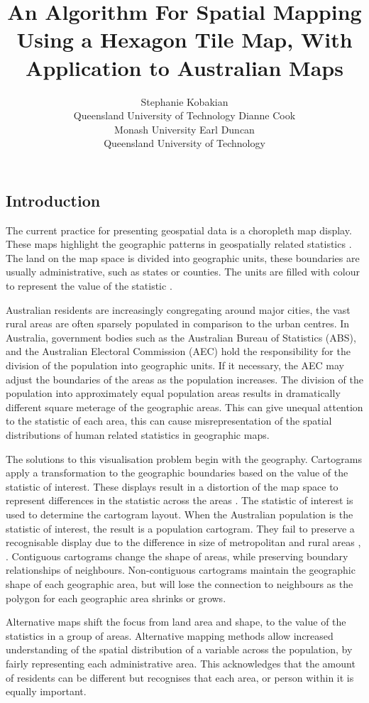 \documentclass[
]{jss}
\author{
Stephanie Kobakian\\Queensland University of Technology \And Dianne Cook\\Monash University \And Earl Duncan\\Queensland University of Technology
}
\title{An Algorithm For Spatial Mapping Using a Hexagon Tile Map, With
Application to Australian Maps}
\begin{document}
\setcounter{page}{65}

\hypertarget{introduction}{%
\subsection{Introduction}\label{introduction}}

The current practice for presenting geospatial data is a choropleth map
display. These maps highlight the geographic patterns in geospatially
related statistics \citep{SAMGIS}. The land on the map space is divided
into geographic units, these boundaries are usually administrative, such
as states or counties. The units are filled with colour to represent the
value of the statistic \citep{EI}.

Australian residents are increasingly congregating around major cities,
the vast rural areas are often sparsely populated in comparison to the
urban centres. In Australia, government bodies such as the Australian
Bureau of Statistics (ABS), and the Australian Electoral Commission
(AEC) hold the responsibility for the division of the population into
geographic units. If it necessary, the AEC may adjust the boundaries of
the areas as the population increases. The division of the population
into approximately equal population areas results in dramatically
different square meterage of the geographic areas. This can give unequal
attention to the statistic of each area, this can cause
misrepresentation of the spatial distributions of human related
statistics in geographic maps.

The solutions to this visualisation problem begin with the geography.
Cartograms apply a transformation to the geographic boundaries based on
the value of the statistic of interest. These displays result in a
distortion of the map space to represent differences in the statistic
across the areas \citep{ACCAC}. The statistic of interest is used to
determine the cartogram layout. When the Australian population is the
statistic of interest, the result is a population cartogram. They fail
to preserve a recognisable display due to the difference in size of
metropolitan and rural areas \citep{ACTUC}, \citep{GOINO}. Contiguous
cartograms change the shape of areas, while preserving boundary
relationships of neighbours. Non-contiguous cartograms maintain the
geographic shape of each geographic area, but will lose the connection
to neighbours as the polygon for each geographic area shrinks or grows.

Alternative maps shift the focus from land area and shape, to the value
of the statistics in a group of areas. Alternative mapping methods allow
increased understanding of the spatial distribution of a variable across
the population, by fairly representing each administrative area. This
acknowledges that the amount of residents can be different but
recognises that each area, or person within it is equally important.
\end{document}
